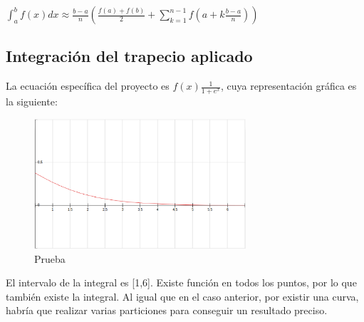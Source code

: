 \documentclass{article}
\begin{document}
      \begin{center}

        $\int_{a}^{b}f(x)dx \approx \frac{b-a}{n}(\frac{f(a)+f(b)}{2}+\sum\limits_{k=1}^{n-1}f(a+k\frac{b-a}{n}))$
      \end{center}

    \subsection{Integración del trapecio aplicado}
      
    La ecuación específica del proyecto es $f(x)\frac{1}{1+e^x}$, cuya representación gráfica es la siguiente:
     
     \begin{figure}[h]
      \begin{center}
         \includegraphics[width=0.7\textwidth]{img4.eps}\caption{Prueba}\label{fig:grafica}
      \end{center}
     \end{figure}

      El intervalo de la integral es [1,6]. Existe función en todos los puntos, por lo que también existe la integral. Al igual que en el caso anterior, por existir una curva, habría que realizar varias particiones para conseguir un resultado preciso.

   \pagebreak


\end{document}
